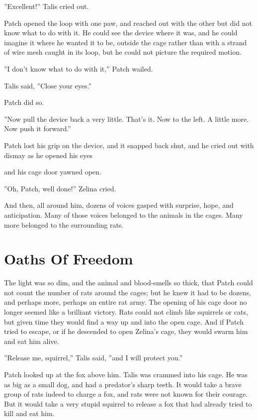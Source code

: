 \documentclass[12pt]{book}
\begin{document}
''Excellent!'' Talis cried out.

Patch opened the loop with one paw, and reached out with the other %
but did not know what to do with it. He could see the device where it was, and he could imagine it where he wanted it to be, outside the cage rather than with a strand of wire mesh caught in its loop, but he could not picture the required motion.

''I don't know what to do with it,'' Patch wailed.

Talis said, ''Close your eyes.''

Patch did so.

''Now pull the device back a very little. That's it. Now to the left. A little more. Now push it forward.''

Patch lost his grip on the device, and it snapped back shut, and he cried out with dismay as he opened his eyes %

and his cage door yawned open.

''Oh, Patch, well done!'' Zelina cried.

And then, all around him, dozens of voices gasped with surprise, hope, and anticipation. Many of those voices belonged to the animals in the cages. Many more belonged to the surrounding rats.


\section{Oaths Of Freedom}

The light was so dim, and the animal and blood-smells so thick, that Patch could not count the number of rats around the cages; but he knew it had to be dozens, and perhaps more, perhaps an entire rat army. The opening of his cage door no longer seemed like a brilliant victory. Rats could not climb like squirrels or cats, but given time they would find a way up and into the open cage. And if Patch tried to escape, or if he descended to open Zelina's cage, they would swarm him and eat him alive.

''Release me, squirrel,'' Talis said, ''and I will protect you.''

Patch looked up at the fox above him. Talis was crammed into his cage. He was as big as a small dog, and had a predator's sharp teeth. It would take a brave group of rats indeed to charge a fox, and rats were not known for their courage. But it would take a very stupid squirrel to release a fox that had already tried to kill and eat him.
\end{document}
